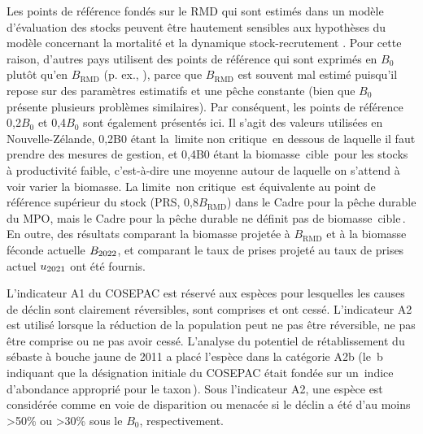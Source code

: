 \documentclass[11pt]{book}
\newcommand{\Bmsy}{B_\text{RMD}}
\newcommand{\angL}{\guillemotleft\,}
\newcommand{\angR}{\,\guillemotright}
\newcommand{\pc}{\%}
\begin{document}
Les points de r\'{e}f\'{e}rence fond\'{e}s sur le RMD qui sont estim\'{e}s dans un mod\`{e}le  d'\'{e}valuation des stocks peuvent \^{e}tre hautement sensibles aux hypoth\`{e}ses du mod\`{e}le concernant la mortalit\'{e} et la dynamique stock-recrutement \citep{Forrest-etal:2018}.
Pour cette raison, d'autres pays utilisent des points de r\'{e}f\'{e}rence qui sont exprim\'{e}s en $B_0$ plut\^{o}t qu'en $\Bmsy$ (p. ex., \citealt{NZMF:2011}), parce que $\Bmsy$ est souvent mal estim\'{e} puisqu'il repose sur des param\`{e}tres estimatifs et une p\^{e}che constante (bien que $B_0$ pr\'{e}sente plusieurs probl\`{e}mes similaires).
Par cons\'{e}quent, les points de r\'{e}f\'{e}rence 0,2$B_0$ et 0,4$B_0$ sont \'{e}galement pr\'{e}sent\'{e}s ici.
Il s'agit des valeurs utilis\'{e}es en Nouvelle-Z\'{e}lande, 0,2B0 \'{e}tant la \angL{}limite non critique\angR{} en dessous de laquelle il faut prendre des mesures de gestion, et 0,4B0 \'{e}tant la biomasse \angL{}cible\angR{} pour les stocks \`{a} productivit\'{e} faible, c'est-\`{a}-dire une moyenne autour de laquelle on s'attend \`{a} voir varier la biomasse.
La limite \angL{}non critique\angR{} est \'{e}quivalente au point de r\'{e}f\'{e}rence sup\'{e}rieur du stock (PRS, 0,8$\Bmsy$) dans le Cadre pour la p\^{e}che durable du MPO, mais le Cadre pour la p\^{e}che durable ne d\'{e}finit pas de biomasse \angL{}cible\angR{}. 
En outre, des r\'{e}sultats comparant la biomasse projet\'{e}e \`{a} $\Bmsy$ et \`{a} la biomasse f\'{e}conde actuelle $B_{2022}$, et comparant le taux de prises projet\'{e} au taux de prises actuel $u_{2021}$ ont \'{e}t\'{e} fournis.

L'indicateur A1 du COSEPAC est r\'{e}serv\'{e} aux esp\`{e}ces pour lesquelles les causes de d\'{e}clin sont clairement r\'{e}versibles, sont comprises et ont cess\'{e}.
L'indicateur A2 est utilis\'{e} lorsque la r\'{e}duction de la population peut ne pas \^{e}tre r\'{e}versible, ne pas \^{e}tre comprise ou ne pas avoir cess\'{e}.
L'analyse du potentiel de r\'{e}tablissement du s\'{e}baste \`{a} bouche jaune de 2011 \citep{Edwards-etal:2012_ymr} a plac\'{e} l'esp\`{e}ce dans la cat\'{e}gorie  A2b (le \angL{}b\angR{} indiquant que la d\'{e}signation initiale du COSEPAC \'{e}tait fond\'{e}e sur un \angL{}indice d'abondance appropri\'{e} pour le taxon\angR{}).
Sous l'indicateur A2, une esp\`{e}ce est consid\'{e}r\'{e}e comme en voie de disparition ou menac\'{e}e si le d\'{e}clin a \'{e}t\'{e} d'au moins >50\pc{} ou >30\pc{} sous le $B_0$, respectivement.
\end{document}

